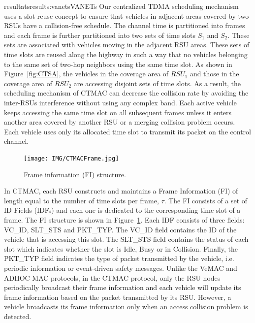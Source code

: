 \documentclass{ra2016}
\begin{document}
\begin{module}{resultats}{results:vanets}{VANETs}
Our centralized TDMA scheduling mechanism uses a slot reuse concept 
to ensure that vehicles in adjacent areas covered by two RSUs have 
a collision-free schedule. The channel time is partitioned into frames and
each frame is further partitioned into two sets of time slots $S_1$ and $S_2$. 
These sets are associated with vehicles moving in the adjacent RSU areas. 
These sets of time slots are reused along the highway in such a way that no vehicles belonging to 
the same set of two-hop 
neighbors using the same time slot. As shown in Figure~\ref{fig:CTSA}, the vehicles in 
the coverage area of $RSU_1$ and those in the coverage area of $RSU_2$ are
accessing disjoint sets of time slots. As a result, the scheduling mechanism of 
CTMAC can decrease the collision rate by avoiding the inter-RSUs interference 
without using any complex band.  Each active vehicle keeps accessing the same 
time slot on all subsequent frames unless it enters another area covered by another 
RSU or a merging collision problem occurs. Each vehicle uses only its allocated 
time slot to transmit its packet on the control channel.


  \begin{figure}[!h]
  \begin{center}
 \texttt{[image: IMG/CTMACFrame.jpg]}
  \caption{Frame information (FI) structure.}
 \label{fig:CTSA_FI}
  \end{center}
\end{figure}

In CTMAC, each RSU constructs and maintains a Frame Information (FI) 
of length equal to the number of time slots per frame, $\tau$. The FI consists 
of a set of ID Fields (IDFs) and each one is dedicated to the corresponding 
time slot of a frame. The FI structure is shown in Figure~\ref{fig:CTSA_FI}. 
Each IDF consists of three fields: VC\_ID, SLT\_STS and PKT\_TYP. 
The VC\_ID field contains the ID of the vehicle that is accessing this slot. 
The SLT\_STS field contains the status of each slot which indicates whether 
the slot is Idle, Busy or in Collision. Finally, the PKT\_TYP field indicates 
the type of packet transmitted by the vehicle, i.e. periodic information or 
event-driven safety messages. Unlike the VeMAC and ADHOC MAC 
protocols, in the CTMAC protocol, only the RSU nodes periodically 
broadcast their frame information and each vehicle will update its frame
 information based on the packet transmitted by its RSU. However, a 
 vehicle broadcasts its frame information only when an access collision problem is detected. 


\end{module}
\end{document}
